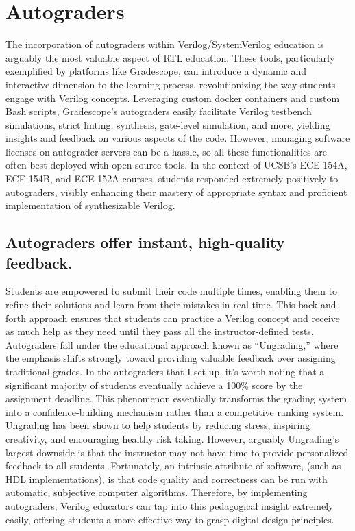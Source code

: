 
\chapter{Autograders}
\label{chapter:autograders}

The incorporation of autograders within Verilog/SystemVerilog education is arguably the most valuable aspect of RTL education. These tools, particularly exemplified by platforms like Gradescope, can introduce a dynamic and interactive dimension to the learning process, revolutionizing the way students engage with Verilog concepts. Leveraging custom docker containers and custom Bash scripts, Gradescope's autograders easily facilitate Verilog testbench simulations, strict linting, synthesis, gate-level simulation, and more, yielding insights and feedback on various aspects of the code. However, managing software licenses on autograder servers can be a hassle, so all these functionalities are often best deployed with open-source tools. In the context of UCSB's ECE 154A, ECE 154B, and ECE 152A courses, students responded extremely positively to autograders, visibly enhancing their mastery of appropriate syntax and proficient implementation of synthesizable Verilog.

\section{Autograders offer instant, high-quality feedback.}

Students are empowered to submit their code multiple times, enabling them to refine their solutions and learn from their mistakes in real time. This back-and-forth approach ensures that students can practice a Verilog concept and receive as much help as they need until they pass all the instructor-defined tests. Autograders fall under the educational approach known as ``Ungrading,'' where the emphasis shifts strongly toward providing valuable feedback over assigning traditional grades. In the autograders that I set up, it's worth noting that a significant majority of students eventually achieve a 100\% score by the assignment deadline. This phenomenon essentially transforms the grading system into a confidence-building mechanism rather than a competitive ranking system. Ungrading has been shown to help students by reducing stress, inspiring creativity, and encouraging healthy risk taking. \cite{kohn:book, blum:article} However, arguably Ungrading's largest downside is that the instructor may not have time to provide personalized feedback to all students. Fortunately, an intrinsic attribute of software, (such as HDL implementations), is that code quality and correctness can be run with automatic, subjective computer algorithms. Therefore, by implementing autograders, Verilog educators can tap into this pedagogical insight extremely easily, offering students a more effective way to grasp digital design principles.

